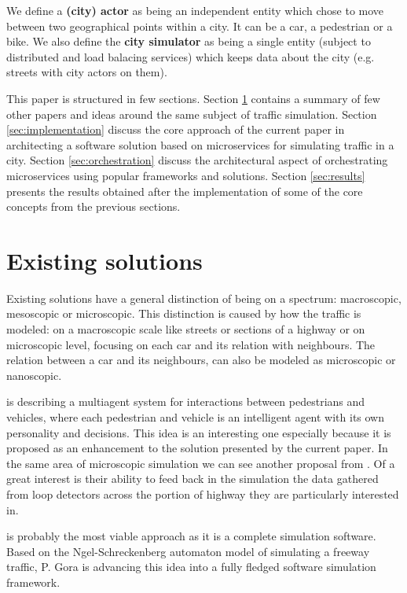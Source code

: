 \documentclass[conference]{IEEEtran}
\begin{document}
We define a \textbf{(city) actor} as being an independent entity which chose to move between two geographical points within a city. It can be a car, a pedestrian or a bike. We also define the \textbf{city simulator} as being a single entity (subject to distributed and load balacing services) which keeps data about the city (e.g. streets with city actors on them).

This paper is structured in few sections. Section \ref{sec:existingsolutions} contains a summary of few other papers and ideas around the same subject of traffic simulation. Section \ref{sec:implementation} discuss the core approach of the current paper in architecting a software solution based on microservices for simulating traffic in a city. Section \ref{sec:orchestration} discuss the architectural aspect of orchestrating microservices using popular frameworks and solutions. Section \ref{sec:results} presents the results obtained after the implementation of some of the core concepts from the previous sections.

\section{Existing solutions}
\label{sec:existingsolutions}

Existing solutions have a general distinction of being on a spectrum: macroscopic, mesoscopic or microscopic. This distinction is caused by how the traffic is modeled: on a macroscopic scale like streets or sections of a highway or on microscopic level, focusing on each car and its relation with neighbours. The relation between a car and its neighbours, can also be modeled as microscopic or nanoscopic.

\cite{6973934} is describing a multiagent system for interactions between pedestrians and vehicles, where each pedestrian and vehicle is an intelligent agent with its own personality and decisions. This idea is an interesting one especially because it is proposed as an enhancement to the solution presented by the current paper. In the same area of microscopic simulation we can see another proposal from \cite{7004985}. Of a great interest is their ability to feed back in the simulation the data gathered from loop detectors across the portion of highway they are particularly interested in.

\cite{6205472} is probably the most viable approach as it is a complete simulation software. Based on the Ngel-Schreckenberg \citep{nagel-schreckenberg} automaton model of simulating a freeway traffic, P. Gora is advancing this idea into a fully fledged software simulation framework.
\end{document}

